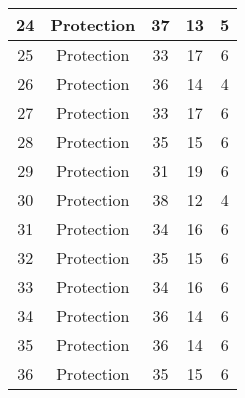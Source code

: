 \documentclass[results.tex]{subfiles}
\begin{document}
\begin{center}
\begin{tabular}{| c || c | c | c | c |}
            \hline
            24                      & Protection                   & 37                     & 13                      & 5                    \\
            \hline
            25                      & Protection                   & 33                     & 17                      & 6                    \\
            \hline
            26                      & Protection                   & 36                     & 14                      & 4                    \\
            \hline
            27                      & Protection                   & 33                     & 17                      & 6                    \\
            \hline
            28                      & Protection                   & 35                     & 15                      & 6                    \\
            \hline
            29                      & Protection                   & 31                     & 19                      & 6                    \\
            \hline
            30                      & Protection                   & 38                     & 12                      & 4                    \\
            \hline
            31                      & Protection                   & 34                     & 16                      & 6                    \\
            \hline
            32                      & Protection                   & 35                     & 15                      & 6                    \\
            \hline
            33                      & Protection                   & 34                     & 16                      & 6                    \\
            \hline
            34                      & Protection                   & 36                     & 14                      & 6                    \\
            \hline
            35                      & Protection                   & 36                     & 14                      & 6                    \\
            \hline
            36                      & Protection                   & 35                     & 15                      & 6                    \\

\end{tabular}
\end{center}
\end{document}
